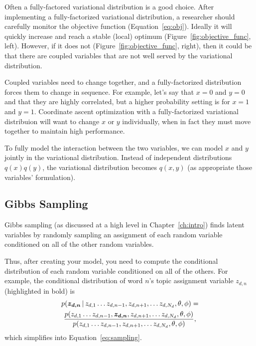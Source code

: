 Often a fully-factored variational distribution is a good choice.
After implementing a fully-factorized variational distribution, a
researcher should carefully monitor the objective function
(Equation~\ref{eq:obj}).  Ideally it will quickly increase and reach a
stable (local) optimum (Figure~\ref{fig:objective_func}, left).
However, if it does not (Figure~\ref{fig:objective_func}, right), then
it could be that there are coupled variables that are not well served
by the variational distribution.

Coupled variables need to change together, and a fully-factorized
distribution forces them to change in sequence.  For example, let's
say that $x=0$ and $y=0$ and that they are highly correlated, but a
higher probability setting is for $x=1$ and $y=1$.  Coordinate ascent
optimization with a fully-factorized variational distribuion will want to change $x$ or $y$
individually, when in fact they must move together to maintain high performance.

To fully model the interaction between the two variables, we can model
$x$ and $y$ jointly in the variational distribution.  Instead of
independent distributions $q(x)q(y)$, the variational distribution
becomes $q(x,y)$ (as appropriate those variables' formulation).

\subsection{Gibbs Sampling}

Gibbs sampling (as discussed at a high level in Chapter~\ref{ch:intro}) finds
latent variables by randomly sampling an assignment of each random
variable conditioned on all of the other random variables.

Thus, after creating your model, you need to compute the conditional
distribution of each random variable conditioned on all of the
others.  For example, the conditional distribution of word $n$'s topic
assignment variable $z_{d,n}$ (highlighted in bold) is
\begin{multline}
p(\bm{z_{d,n}} \, | \, z_{d, 1} \dots z_{d, n-1}, z_{d, n+1}, \dots z_{d, N_d},
\theta, \phi) = \\
\frac{p(z_{d, 1} \dots z_{d, n-1}, \bm{z_{d, n}}, z_{d, n+1}, \dots z_{d, N_d}, \theta, \phi)}{ p(z_{d, 1} \dots z_{d, n-1}, z_{d, n+1}, \dots z_{d, N_d},
\theta, \phi)},
\label{eq:gibbs_conditional}
\end{multline}
which simplifies into Equation~\ref{eq:sampling}.

